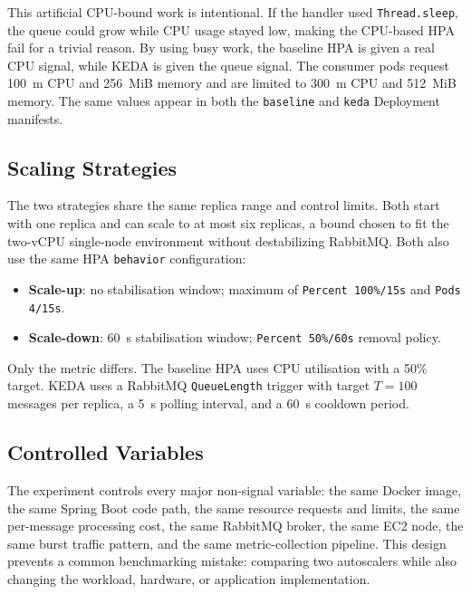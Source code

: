 This artificial CPU-bound work is intentional. If the handler used \texttt{Thread.sleep}, the queue could grow while CPU usage stayed low, making the CPU-based HPA fail for a trivial reason. By using busy work, the baseline HPA is given a real CPU signal, while KEDA is given the queue signal. The consumer pods request 100~m CPU and 256~MiB memory and are limited to 300~m CPU and 512~MiB memory. The same values appear in both the \texttt{baseline} and \texttt{keda} Deployment manifests.

\subsection{Scaling Strategies}
\label{subsec:strategies}
The two strategies share the same replica range and control limits. Both start with one replica and can scale to at most six replicas, a bound chosen to fit the two-vCPU single-node environment without destabilizing RabbitMQ. Both also use the same HPA \texttt{behavior} configuration:
\begin{itemize}
  \item \textbf{Scale-up}: no stabilisation window; maximum of \texttt{Percent 100\%/15s} and \texttt{Pods 4/15s}.
  \item \textbf{Scale-down}: 60~s stabilisation window; \texttt{Percent 50\%/60s} removal policy.
\end{itemize}
Only the metric differs. The baseline HPA uses CPU utilisation with a 50\% target. KEDA uses a RabbitMQ \texttt{QueueLength} trigger with target $T=100$ messages per replica, a 5~s polling interval, and a 60~s cooldown period.

\subsection{Controlled Variables}
\label{subsec:controls}
The experiment controls every major non-signal variable: the same Docker image, the same Spring Boot code path, the same resource requests and limits, the same per-message processing cost, the same RabbitMQ broker, the same EC2 node, the same burst traffic pattern, and the same metric-collection pipeline. This design prevents a common benchmarking mistake: comparing two autoscalers while also changing the workload, hardware, or application implementation.
